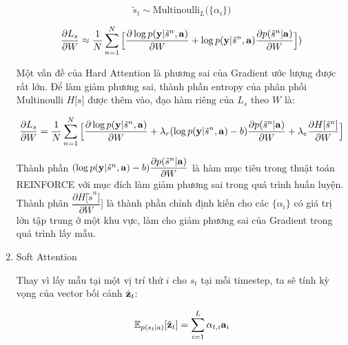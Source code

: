 \documentclass[14pt, a4paper]{article}
\numberwithin{equation}{section}
\numberwithin{algorithm}{section}
\numberwithin{figure}{section}
\numberwithin{dl}{section}
\numberwithin{md}{section}
\numberwithin{bd}{section}
\numberwithin{dn}{section}
\numberwithin{hq}{section}
\begin{document}
\begin{enumerate}[label=(\alph*)]
        \begin{equation}
            \tilde{s}_t \sim \mathrm{Multinoulli}_L \big(\lbrace \alpha_i \big\rbrace)
        \end{equation}

        \begin{equation}
            \dfrac{\partial L_s}{\partial W} \approx \dfrac{1}{N}\sum_{n=1}^N \Big\lbrack \dfrac{\partial \log p(\bold{y} \vert \tilde{s}^n, \bold{a})}{\partial W} + \log p(\bold{y} \vert \tilde{s}^n, \bold{a}) \dfrac{\partial p(\tilde{s}^n \vert \bold{a})}{\partial W} \Big\rbrack)
        \end{equation}

        Một vấn đề của Hard Attention là phương sai của Gradient ước lượng được rất lớn.
        Để làm giảm phương sai, thành phần entropy của phân phối Multinoulli $H \lbrack s \rbrack$ được thêm vào, đạo hàm riêng của $L_s$ theo $W$ là:

        \begin{equation}
            \dfrac{\partial L_s}{\partial W}=\dfrac{1}{N}\sum_{n=1}^N \Big\lbrack \dfrac{\partial \log p(\bold{y} \vert \tilde{s}^n, \bold{a})}{\partial W} + \lambda_r (\log p(\bold{y} \vert \tilde{s}^n, \bold{a}) - b)\dfrac{\partial p(\tilde{s}^n \vert \bold{a})}{\partial W} + \lambda_e \dfrac{\partial H \lbrack \tilde{s}^n \rbrack}{\partial W} \Big \rbrack
        \end{equation}

        Thành phần $(\log p(\bold{y} \vert \tilde{s}^n, \bold{a}) - b)\dfrac{\partial p(\tilde{s}^n \vert \bold{a})}{\partial W}$ là hàm mục tiêu trong thuật toán REINFORCE \cite{williams1992simple} với mục đích làm giảm phương sai trong quá trình huấn luyện.
        Thành phân $\dfrac{\partial H \lbrack \tilde{s}^n \rbrack}{\partial W} \Big \rbrack$ là thành phần chỉnh định kiến cho các $\lbrace \alpha_i \rbrace$ có giá trị lớn tập trung ở một khu vực, làm cho giảm phương sai của Gradient trong quá trình lấy mẫu.

        \item Soft Attention
        
        Thay vì lấy mẫu tại một vị trí thứ $i$ cho $s_t$ tại mỗi timestep, ta sẽ tính kỳ vọng của vector bối cảnh $\hat{\bold{z}}_t$:

        \begin{equation}
            \mathbb{E}_{p(s_t \vert a)}\lbrack \hat{\bold{z}}_t \rbrack=\sum_{i=1}^L \alpha_{t,i}\bold{a}_i
        \end{equation}


\end{enumerate}
\end{document}
